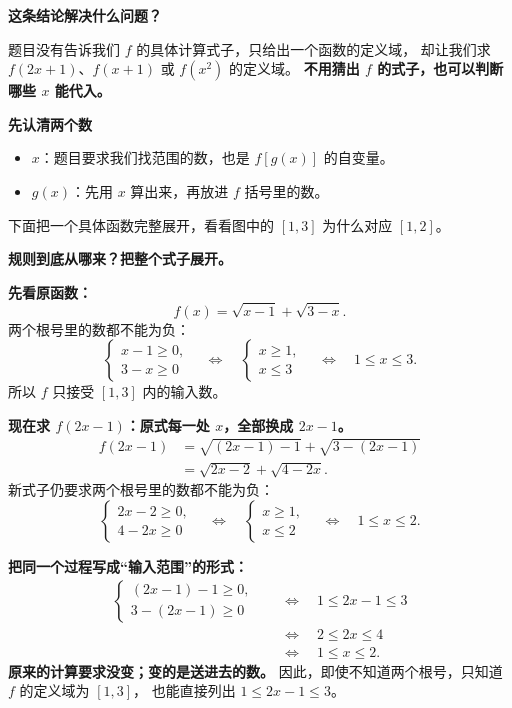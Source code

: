 \begin{statementbox}
\textbf{\textcolor{CStatement}{这条结论解决什么问题？}}

题目没有告诉我们 $f$ 的具体计算式子，只给出一个函数的定义域，
却让我们求 $f(2x+1)$、$f(x+1)$ 或 $f(x^2)$ 的定义域。
\textbf{不用猜出 $f$ 的式子，也可以判断哪些 $x$ 能代入。}

\begin{center}\end{center}
\textbf{\textcolor{CStatement}{先认清两个数}}
\begin{itemize}[leftmargin=*,itemsep=0.3em]
  \item $x$：题目要求我们找范围的数，也是 $f[g(x)]$ 的自变量。
  \item $g(x)$：先用 $x$ 算出来，再放进 $f$ 括号里的数。
\end{itemize}
下面把一个具体函数完整展开，看看图中的 $[1,3]$ 为什么对应 $[1,2]$。
\end{statementbox}
\clearpage
\begin{statementbox}
\textbf{\textcolor{CStatement}{规则到底从哪来？把整个式子展开。}}

\textbf{先看原函数：}
\[
 f(x)=\sqrt{x-1}+\sqrt{3-x}.
\]
两个根号里的数都不能为负：
\[
 \begin{cases}
 x-1\ge0,\\
 3-x\ge0
 \end{cases}
 \quad\Longleftrightarrow\quad
 \begin{cases}
 x\ge1,\\
 x\le3
 \end{cases}
 \quad\Longleftrightarrow\quad
 \boxed{1\le x\le3}.
\]
所以 $f$ 只接受 $[1,3]$ 内的输入数。

\medskip
\textbf{现在求 $f(2x-1)$：原式每一处 $x$，全部换成 $2x-1$。}
\[
 \begin{aligned}
 f(2x-1)
 &=\sqrt{(2x-1)-1}
   +\sqrt{3-(2x-1)}\\[8pt]
 &=\sqrt{2x-2}+\sqrt{4-2x}.
 \end{aligned}
\]
新式子仍要求两个根号里的数都不能为负：
\[
 \begin{cases}
 2x-2\ge0,\\
 4-2x\ge0
 \end{cases}
 \quad\Longleftrightarrow\quad
 \begin{cases}
 x\ge1,\\
 x\le2
 \end{cases}
 \quad\Longleftrightarrow\quad
 \boxed{1\le x\le2}.
\]

\medskip
\textbf{把同一个过程写成“输入范围”的形式：}
\[
 \begin{aligned}
 \begin{cases}(2x-1)-1\ge0,\\3-(2x-1)\ge0\end{cases}
 &\quad\Longleftrightarrow\quad 1\le2x-1\le3\\[6pt]
 &\quad\Longleftrightarrow\quad 2\le2x\le4\\[6pt]
 &\quad\Longleftrightarrow\quad 1\le x\le2.
 \end{aligned}
\]
\textbf{原来的计算要求没变；变的是送进去的数。}
因此，即使不知道两个根号，只知道 $f$ 的定义域为 $[1,3]$，
也能直接列出 $1\le2x-1\le3$。
\end{statementbox}
